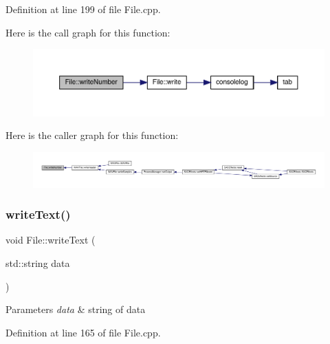 Definition at line 199 of file File.\+cpp.

Here is the call graph for this function\+:
\nopagebreak
\begin{figure}[H]
\begin{center}
\leavevmode
\includegraphics[width=350pt]{class_file_a75a4a4b828576e6912f75e22a7250e92_cgraph}
\end{center}
\end{figure}
Here is the caller graph for this function\+:
\nopagebreak
\begin{figure}[H]
\begin{center}
\leavevmode
\includegraphics[width=350pt]{class_file_a75a4a4b828576e6912f75e22a7250e92_icgraph}
\end{center}
\end{figure}
\mbox{\label{class_file_a156d4a3d1e12e9ddf9c4948cae8c9734}} 
\subsubsection{\texorpdfstring{write\+Text()}{writeText()}}
{\footnotesize\ttfamily void File\+::write\+Text (\begin{DoxyParamCaption}\item[{std\+::string}]{data }\end{DoxyParamCaption})}


\begin{DoxyParams}{Parameters}
{\em data} & string of data \\
\hline
\end{DoxyParams}


Definition at line 165 of file File.\+cpp.


